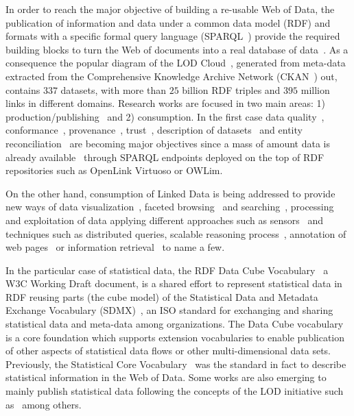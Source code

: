 In order to reach the major objective of building a re-usable Web of Data,  
the publication of information and data under a common data model (RDF) and formats with 
a specific formal query language (SPARQL~\cite{Sparql11}) provide the required building blocks to turn 
the Web of documents into a real database of data~\cite{freebase}. As a consequence the popular 
diagram of the LOD Cloud~\cite{linked-data-cloud}, generated from meta-data extracted from the Comprehensive Knowledge Archive Network (CKAN~\cite{ckan}) out, 
contains $337$ datasets, with more than $25$ billion RDF triples and $395$ million links in different  domains. 
Research works are focused in two main areas: 1) production/publishing~\cite{bizer07how} and 2) consumption. 
In the first case data quality~\cite{bizer2007,wiqa,ld-quality,lodq,link-qa}, conformance~\cite{HoganUHCPD:2012:237}, 
provenance~\cite{w3c-prov,DBLP:conf/ipaw/HartigZ10}, trust~\cite{Carroll05namedgraphs}, description of datasets~\cite{void,Cyganiak08semanticsitemaps,ckanValidator} and 
entity reconciliation~\cite{Serimi,Maali_Cyganiak_2011} are becoming major objectives since a mass of amount data is already available~\cite{Triplify} 
through SPARQL endpoints deployed on the top of RDF repositories such as OpenLink Virtuoso or OWLim. 

On the other hand, consumption of Linked Data is being addressed to provide new ways of data visualization~\cite{DBLP:journals/semweb/DadzieR11,hoga-etal-2011-swse-JWS}, 
faceted browsing~\cite{Pietriga06fresnel,citeulike:8529753,Sparallax} and searching~\cite{hoga-etal-2011-swse-JWS}, processing~\cite{Harth:2011:SIP:1963192.1963318} and exploitation of data applying 
different approaches such as sensors~\cite{Jeung:2010:EMM:1850003.1850235,ontology-search} and techniques  such as distributed 
queries\cite{Hartig09executingsparql,Ankolekar07thetwo,sparqlOpt}, scalable reasoning process~\cite{DBLP:conf/semweb/UrbaniKOH09,HoganHarthPolleres2009,DBLP:conf/semweb/HoganPPD10}, 
annotation of web pages~\cite{rdfa-primer} or information retrieval~\cite{Pound} to name a few.

In the particular case of statistical data, the RDF Data Cube Vocabulary~\cite{rdf-data-cube}
a W3C Working Draft document, is a shared effort to represent statistical data in RDF reusing parts (the cube model) 
of the Statistical Data and Metadata Exchange Vocabulary (SDMX)~\cite{sdmx}, an ISO standard 
for exchanging and sharing statistical data and meta-data among organizations. The Data Cube vocabulary is a core 
foundation which supports extension vocabularies to enable publication of other aspects of statistical data flows or 
other multi-dimensional data sets. Previously, the Statistical Core Vocabulary~\cite{scovo} was the standard in fact to describe statistical information in the Web of Data.
Some works are also emerging to mainly publish statistical data following the concepts of the LOD initiative 
such as~\cite{DBLP:conf/semweb/ZapilkoM11,DBLP:journals/ijsc/SalasMBCMA12,DDI2013,DBLP:conf/dgo/FernandezMG11,webindexlod} 
among others.

